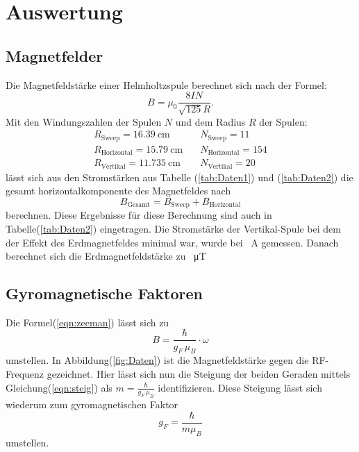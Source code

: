\section{Auswertung}
	

	\subsection{Magnetfelder}
		
		\noindent
		Die Magnetfeldstärke einer Helmholtzspule berechnet sich nach der Formel:
		\begin{equation}
			B = \mu_0 \frac{8IN}{\sqrt{125}R}.
		\end{equation}		
		Mit den Windungszahlen der Spulen $N$ und dem Radius $R$ der Spulen:
		\begin{align*}
			R_\text{Sweep} = \SI{16.39}{\centi\metre}			\quad   &N_\text{Sweep}    = 11		\\
			R_\text{Horizontal} = \SI{15.79}{\centi\metre}		\quad 	&N_\text{Horizontal} = 154  \\
			R_\text{Vertikal} = \SI{11.735}{\centi\metre}		\quad	&N_\text{Vertikal} = 20
		\end{align*}
		lässt sich aus den Stromstärken aus Tabelle (\ref{tab:Daten1}) und (\ref{tab:Daten2}) die gesamt horizontalkomponente des Magnetfeldes nach
		\begin{equation*}
			B_\text{Gesamt} = B_\text{Sweep} + B_\text{Horizontal}
		\end{equation*} 
		berechnen. Diese Ergebnisse für diese Berechnung sind auch in Tabelle(\ref{tab:Daten2}) eingetragen.
		Die Stromstärke der Vertikal-Spule bei dem der Effekt des Erdmagnetfeldes minimal war, wurde bei \SI{}{\ampere}  gemessen.
		Danach berechnet sich die Erdmagnetfeldstärke zu \SI{}{\micro\tesla}
		
	\subsection{Gyromagnetische Faktoren}
		
		\noindent
		Die Formel(\ref{eqn:zeeman}) lässt sich zu 
		\begin{equation*}
			B = \frac{\hbar}{g_F \, \mu_B} \cdot \omega
			\label{eqn:steig}
		\end{equation*}
		umstellen. In Abbildung(\ref{fig:Daten}) ist die Magnetfeldstärke gegen die RF-Frequenz gezeichnet.
		Hier lässt sich nun die Steigung der beiden Geraden mittels Gleichung(\ref{eqn:steig}) als $ m = \frac{\hbar}{g_F \, \mu_B}$ identifizieren.		
		Diese Steigung lässt sich wiederum zum gyromagnetischen Faktor
		\begin{equation}
		 	g_F = \frac{\hbar}{m \mu_B}
			\label{eqn:gyro}
		\end{equation}
		umstellen.		


